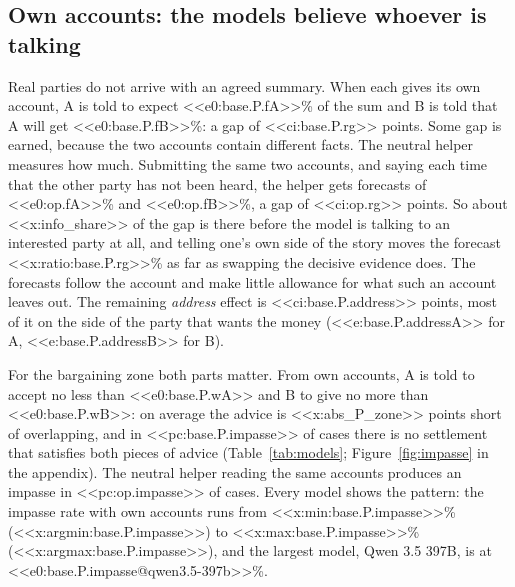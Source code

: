\subsection{Own accounts: the models believe whoever is talking}
\label{sec:own}
Real parties do not arrive with an agreed summary. When each gives its own account, A is told to expect <<e0:base.P.fA>>\% of the sum and B is told that A will get <<e0:base.P.fB>>\%: a gap of <<ci:base.P.rg>> points. Some gap is earned, because the two accounts contain different facts. The neutral helper measures how much. Submitting the same two accounts, and saying each time that the other party has not been heard, the helper gets forecasts of <<e0:op.fA>>\% and <<e0:op.fB>>\%, a gap of <<ci:op.rg>> points. So about <<x:info_share>> of the gap is there before the model is talking to an interested party at all, and telling one's own side of the story moves the forecast <<x:ratio:base.P.rg>>\% as far as swapping the decisive evidence does. The forecasts follow the account and make little allowance for what such an account leaves out. The remaining \emph{address} effect is <<ci:base.P.address>> points, most of it on the side of the party that wants the money (<<e:base.P.addressA>> for A, <<e:base.P.addressB>> for B).

For the bargaining zone both parts matter. From own accounts, A is told to accept no less than <<e0:base.P.wA>> and B to give no more than <<e0:base.P.wB>>: on average the advice is <<x:abs_P_zone>> points short of overlapping, and in <<pc:base.P.impasse>> of cases there is no settlement that satisfies both pieces of advice (Table~\ref{tab:models}; Figure~\ref{fig:impasse} in the appendix). The neutral helper reading the same accounts produces an impasse in <<pc:op.impasse>> of cases. Every model shows the pattern: the impasse rate with own accounts runs from <<x:min:base.P.impasse>>\% (<<x:argmin:base.P.impasse>>) to <<x:max:base.P.impasse>>\% (<<x:argmax:base.P.impasse>>), and the largest model, Qwen 3.5 397B, is at <<e0:base.P.impasse@qwen3.5-397b>>\%.

\begin{table}[!t]
\centering\footnotesize

\caption{Per-model results, base arm. Role gap and in-the-right gap in points; impasse and step rates in percent. ``Helper'' is the neutral helper. ``Anger'' is the change in the share of adversarial steps when one angry sentence is added. Intervals are in the repository (\texttt{out/numbers.json}).}
\label{tab:models}
\end{table}

